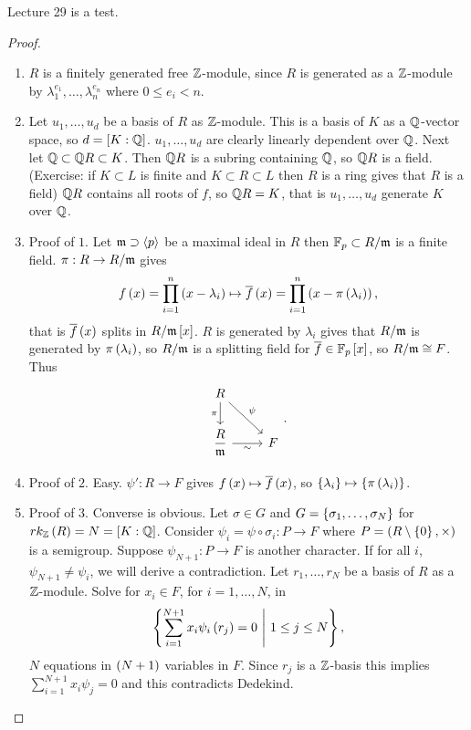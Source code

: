 
Lecture 29 is a test.


\begin{proof}
\hfill
\begin{enumerate}[leftmargin=0.5in, label=Step \arabic*.]
\item $ R $ is a finitely generated free $ \mathbb{Z} $-module, since $ R $ is generated as a $ \mathbb{Z} $-module by $ \lambda_1^{e_1}, \dots, \lambda_n^{e_n} $ where $ 0 \le e_i < n $.
\item Let $ u_1, \dots, u_d $ be a basis of $ R $ as $ \mathbb{Z} $-module. This is a basis of $ K $ as a $ \mathbb{Q} $-vector space, so $ d = \left[ K : \mathbb{Q} \right] $. $ u_1, \dots, u_d $ are clearly linearly dependent over $ \mathbb{Q} $. Next let $ \mathbb{Q} \subset \mathbb{Q} R \subset K $. Then $ \mathbb{Q} R $ is a subring containing $ \mathbb{Q} $, so $ \mathbb{Q} R $ is a field. (Exercise: if $ K \subset L $ is finite and $ K \subset R \subset L $ then $ R $ is a ring gives that $ R $ is a field) $ \mathbb{Q} R $ contains all roots of $ f $, so $ \mathbb{Q} R = K $, that is $ u_1, \dots, u_d $ generate $ K $ over $ \mathbb{Q} $.
\item Proof of $ 1 $. Let $ \mathfrak{m} \supset \left\langle p \right\rangle $ be a maximal ideal in $ R $ then $ \mathbb{F}_p \subset R / \mathfrak{m} $ is a finite field. $ \pi : R \to R / \mathfrak{m} $ gives
$$ f\left( x \right) = \prod_{i = 1}^n \left( x - \lambda_i \right) \mapsto \overline{f}\left( x \right) = \prod_{i = 1}^n \left( x - \pi\left( \lambda_i \right) \right), $$
that is $ \overline{f}\left( x \right) $ splits in $ R / \mathfrak{m}\left[ x \right] $. $ R $ is generated by $ \lambda_i $ gives that $ R / \mathfrak{m} $ is generated by $ \pi\left( \lambda_i \right) $, so $ R / \mathfrak{m} $ is a splitting field for $ \overline{f} \in \mathbb{F}_p\left[ x \right] $, so $ R / \mathfrak{m} \cong F $. Thus
$$
\begin{tikzcd}
R \arrow{dr}{\psi} \arrow[swap]{d}{\pi} & \\
\dfrac{R}{\mm} \arrow[swap]{r}{\sim} & F
\end{tikzcd}.
$$
\item Proof of $ 2 $. Easy. $ \psi' : R \to F $ gives $ f\left( x \right) \mapsto \overline{f}\left( x \right) $, so $ \left\{ \lambda_i \right\} \mapsto \left\{ \pi\left( \lambda_i \right) \right\} $.
\item Proof of $ 3 $. Converse is obvious. Let $ \sigma \in G $ and $ G = \left\{ \sigma_1, \dots, \sigma_N \right\} $ for $ rk_{\mathbb{Z}}\left( R \right) = N = \left[ K : \mathbb{Q} \right] $. Consider $ \psi_i = \psi \circ \sigma_i : P \to F $ where $ P = \left( R \setminus \left\{ 0 \right\}, \times \right) $ is a semigroup. Suppose $ \psi_{N + 1} : P \to F $ is another character. If for all $ i $, $ \psi_{N + 1} \ne \psi_i $, we will derive a contradiction. Let $ r_1, \dots, r_N $ be a basis of $ R $ as a $ \mathbb{Z} $-module. Solve for $ x_i \in F $, for $ i = 1, \dots, N $, in
$$ \left\{ \sum_{i = 1}^{N + 1} x_i\psi_i\left( r_j \right) = 0 \ \Bigg| \ 1 \le j \le N \right\}, $$
$ N $ equations in $ \left( N + 1 \right) $ variables in $ F $. Since $ r_j $ is a $ \mathbb{Z} $-basis this implies $ \sum_{i = 1}^{N + 1} x_i\psi_j = 0 $ and this contradicts Dedekind.
\end{enumerate}
\end{proof}

